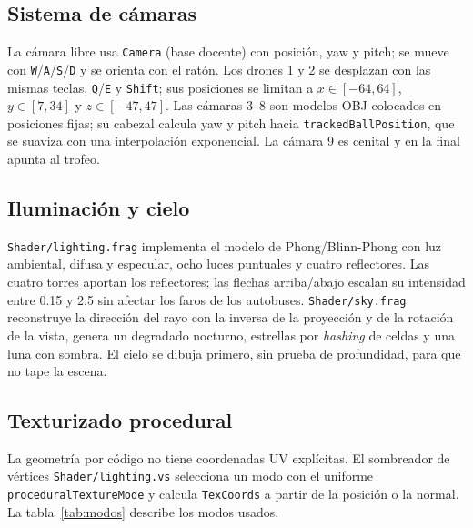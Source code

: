 \documentclass[12pt,letterpaper]{article}
\begin{document}
\subsection{Sistema de cámaras}
La cámara libre usa \texttt{Camera} (base docente) con posición, yaw y pitch; se mueve con
\texttt{W}/\texttt{A}/\texttt{S}/\texttt{D} y se orienta con el ratón. Los drones 1 y 2 se desplazan
con las mismas teclas, \texttt{Q}/\texttt{E} y \texttt{Shift}; sus posiciones se limitan a
$x\in[-64,64]$, $y\in[7,34]$ y $z\in[-47,47]$. Las cámaras 3--8 son modelos OBJ colocados en
posiciones fijas; su cabezal calcula yaw y pitch hacia \texttt{trackedBallPosition}, que se suaviza
con una interpolación exponencial. La cámara 9 es cenital y en la final apunta al trofeo.

\subsection{Iluminación y cielo}
\texttt{Shader/lighting.frag} implementa el modelo de Phong/Blinn-Phong con luz ambiental, difusa y
especular, ocho luces puntuales y cuatro reflectores. Las cuatro torres aportan los reflectores; las
flechas arriba/abajo escalan su intensidad entre 0.15 y 2.5 sin afectar los faros de los autobuses.
\texttt{Shader/sky.frag} reconstruye la dirección del rayo con la inversa de la proyección y de la
rotación de la vista, genera un degradado nocturno, estrellas por \emph{hashing} de celdas y una luna
con sombra. El cielo se dibuja primero, sin prueba de profundidad, para que no tape la escena.

\subsection{Texturizado procedural}
La geometría por código no tiene coordenadas UV explícitas. El sombreador de vértices
\texttt{Shader/lighting.vs} selecciona un modo con el uniforme \texttt{proceduralTextureMode} y
calcula \texttt{TexCoords} a partir de la posición o la normal. La tabla~\ref{tab:modos} describe los
modos usados.
\end{document}
